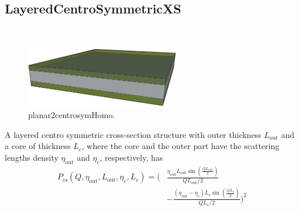 \clearpage
\subsection{LayeredCentroSymmetricXS}
\label{sect:LayeredCentroSymmetricXS}
~\\

\begin{figure}[htb]
\begin{center}
\includegraphics[width=0.6\textwidth,height=0.4\textwidth]{planar2centrosymm.png}
\end{center}
\caption{planar2centrosymHomo.}
\label{fig:planar2centrosymm}
\end{figure}
A layered centro symmetric cross-section structure with outer
thickness $L_\text{out}$ and a core of thickness $L_c$, where the
core and the outer part have the scattering lengths density
$\eta_\text{out}$ and $\eta_c$, respectively, has
\begin{align}
P_\text{cs}(Q,\eta_\text{out},L_\text{out},\eta_c,L_c)
= \Biggl( & \frac{\eta_\text{out}L_\text{out}\sin\left(\frac{QL_\text{out}}{2}\right)}{QL_\text{out}/2} \\
&-  \frac{(\eta_\text{out}-\eta_c)L_c\sin\left(\frac{QL_c}{2}\right)}{QL_c/2}\Biggr)^2 \nonumber
\end{align}


\clearpage
